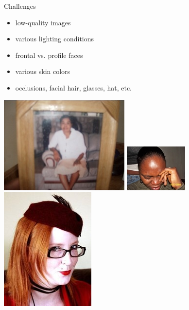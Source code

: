 \begin{xpsectionbox}{Challenges}{}

\begin{minipage}{0.4\linewidth}
\begin{itemize}
	  \item low-quality images
	  \item various lighting conditions
	  \item frontal vs. profile faces
	  \item various skin colors
	  \item occlusions, facial hair, glasses, hat, etc.
\end{itemize}
\end{minipage}
\begin{minipage}{0.6\linewidth}
\begin{center}
			\includegraphics[height=0.25\linewidth]{images/PL_low_quality}
			\includegraphics[height=0.25\linewidth]{images/HEPL_occlusion}
			\includegraphics[height=0.25\linewidth]{images/HEPL_spectacles_hat}
\end{center}
\end{minipage}

\end{xpsectionbox}


